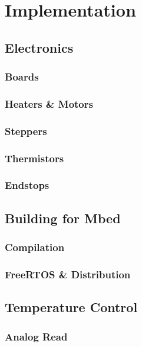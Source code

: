 \chapter{Implementation}
	
	\section{Electronics}
		
		\subsection{Boards}
		
		\subsection{Heaters \& Motors}
		
		\subsection{Steppers}
		
		\subsection{Thermistors}
		
		\subsection{Endstops}
	
	\section{Building for Mbed}
		
		\subsection{Compilation}
		
		\subsection{FreeRTOS \& \uIP{} Distribution}
	
	\section{Temperature Control}
		
		\subsection{Analog Read}
		
